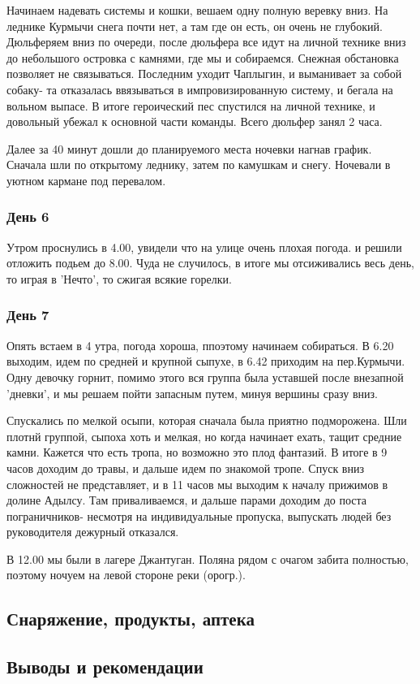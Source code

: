 \documentclass[]{article}
\begin{document}
Начинаем надевать системы и кошки, вешаем одну полную веревку вниз. На леднике Курмычи снега почти нет, а там где он есть, он очень не глубокий. Дюльферяем вниз по очереди, после дюльфера все идут на личной технике вниз до небольшого островка с камнями, где мы и собираемся. Снежная обстановка позволяет не связываться. 
Последним уходит Чаплыгин, и выманивает за собой собаку- та отказалась ввязываться в импровизированную систему, и бегала на вольном выпасе.
В итоге героический пес спустился на личной технике, и довольный убежал к основной части команды.
Всего дюльфер занял 2 часа. 

Далее за 40 минут дошли до планируемого места ночевки нагнав график. Сначала шли по открытому леднику, затем по камушкам и снегу. Ночевали в уютном кармане под перевалом. 

\subsubsection{День 6}
Утром проснулись в 4.00, увидели что на улице очень плохая погода. и решили отложить подьем до 8.00. Чуда не случилось, в итоге мы отсиживались весь день, то играя в 'Нечто', то сжигая всякие горелки.

\subsubsection{День 7}
Опять встаем в 4 утра, погода хороша, ппоэтому начинаем собираться. В 6.20 выходим, идем по средней и крупной сыпухе,  в 6.42 приходим на пер.Курмычи. Одну девочку горнит, помимо этого вся группа была уставшей после внезапной 'дневки', и мы решаем пойти запасным путем, минуя вершины сразу вниз.

Спускались по мелкой осыпи, которая сначала была приятно подморожена. Шли плотнй группой, сыпоха хоть и мелкая, но когда начинает ехать, тащит средние камни. Кажется что есть тропа, но возможно это плод фантазий. В итоге в 9 часов доходим до травы, и дальше идем по знакомой тропе. Спуск вниз сложностей не представляет, и в 11 часов мы выходим к началу прижимов в долине Адылсу. Там приваливаемся, и дальше парами доходим до поста пограничников- несмотря на индивидуальные пропуска, выпускать людей без руководителя дежурный отказался.

В 12.00 мы были в лагере Джантуган. Поляна рядом с очагом забита полностью, поэтому ночуем на левой стороне реки (орогр.).



\subsection{Снаряжение, продукты, аптека}

\subsection{Выводы и рекомендации}

	
\end{document}
